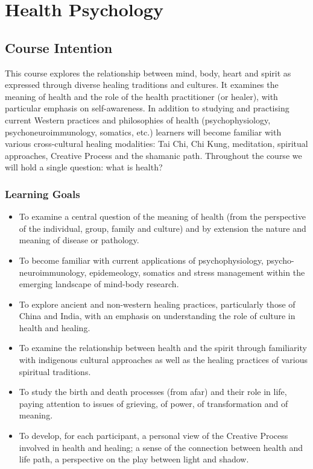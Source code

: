 \documentclass[10pt,DIV09,letterpaper,oneside,headsepline]{scrreprt}
\begin{document}
\clearpage


\chapter{Health Psychology}

\section{Course Intention}

This course explores the relationship between mind, body, heart and spirit as expressed through diverse healing traditions and cultures. It examines the meaning of health and the role of the health practitioner (or healer), with particular emphasis on self-awareness. In addition to studying and practising current Western practices and philosophies of health (psychophysiology, psychoneuroimmunology, somatics, etc.) learners will become familiar with various cross-cultural healing modalities: Tai Chi, Chi Kung, meditation, spiritual approaches, Creative Process and the shamanic path. Throughout the course we will hold a single question: what is health?

\subsection{Learning Goals}

\begin{itemize}

\item To examine a central question of the meaning of health (from the perspective of the individual, group, family and culture) and by extension the nature and meaning of disease or pathology.

\item To become familiar with current applications of psychophysiology, psycho-neuroimmunology, epidemeology, somatics and stress management within the emerging landscape of mind-body research.

\item To explore ancient and non-western healing practices, particularly those of China and India, with an emphasis on understanding the role of culture in health and healing.

\item To examine the relationship between health and the spirit through familiarity with indigenous cultural approaches as well as the healing practices of various spiritual traditions.

\item To study the birth and death processes (from afar) and their role in life, paying attention to issues of grieving, of power, of transformation and of meaning.

\item To develop, for each participant, a personal view of the Creative Process involved in health and healing; a sense of the connection between health and life path, a perspective on the play between light and shadow.

\end{itemize}
\end{document}
